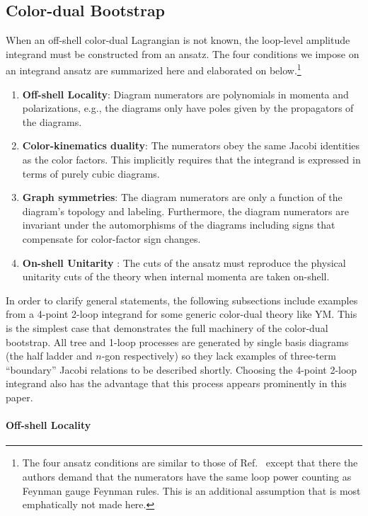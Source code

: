 \documentclass[11pt,letter]{article}
\begin{document}
\subsection{Color-dual Bootstrap}
\label{sec:bootstrap}

When an off-shell color-dual Lagrangian is not known, the loop-level amplitude integrand must be constructed from an ansatz.  The four conditions we impose on an integrand ansatz are summarized
here and elaborated on below.\footnote{The four ansatz conditions are
  similar to those of Ref.~\cite{Bern:2015ooa} except that there the
  authors demand that the numerators have the same loop power counting
  as Feynman gauge Feynman rules.  This is an additional assumption
  that is most emphatically not made here.}
\begin{enumerate}
\item \textbf{Off-shell Locality}: Diagram numerators are polynomials
  in momenta and polarizations, e.g., the diagrams only have poles given
  by the propagators of the diagrams.
\item \textbf{Color-kinematics duality}: The numerators obey the same
  Jacobi identities as the color factors.  This implicitly requires
  that the integrand is expressed in terms of purely cubic diagrams.
\item \textbf{Graph symmetries}: The diagram numerators are only a
  function of the diagram's topology and labeling.  Furthermore, the
  diagram numerators are invariant under the automorphisms of the
  diagrams including signs that compensate for color-factor sign
    changes.
\item \textbf{On-shell Unitarity }: The cuts of the ansatz must
  reproduce the physical unitarity cuts of the theory when internal
  momenta are taken on-shell.
\end{enumerate}

In order to clarify general statements, the following subsections
include examples from a 4-point 2-loop integrand for some generic
color-dual theory like YM.  This is the simplest case that
demonstrates the full machinery of the color-dual bootstrap.  All tree
and 1-loop processes are generated by single basis diagrams (the half
ladder and $n$-gon respectively) so they lack examples of three-term
``boundary'' Jacobi relations to be described shortly.
Choosing the 4-point 2-loop integrand also has the advantage that this
process appears prominently in this paper.

\paragraph{Off-shell Locality}
\end{document}
